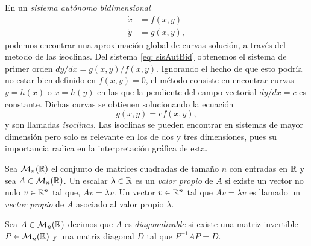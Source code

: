    En un \textit{sistema autónomo bidimensional}
   \begin{equation}
   	\begin{aligned}
   		\dot{x} &= f(x, y) \\
   		\dot{y} &= g(x, y),
   	\end{aligned}
   	\label{eq: sisAutBid}
   \end{equation}
   podemos encontrar una aproximación global de curvas solución, a través del metodo de las isoclinas. Del sistema \eqref{eq: sisAutBid} obtenemos el sistema de primer orden $dy/dx = g(x, y)/f(x, y)$. Ignorando el hecho de que esto podría no estar bien definido en $f(x, y) = 0$, el método consiste en encontrar curvas $y=h(x)$ o $x=h(y)$ en las que la pendiente del campo vectorial $dy/dx = c$ es constante. Dichas curvas se obtienen solucionando la ecuación
   \begin{equation}
    g(x, y) = cf(x, y),
    \label{eq: pendiente}
   \end{equation} 
   y son llamadas \textit{isoclinas}. Las isoclinas se pueden encontrar en sistemas de mayor dimensión pero solo es relevante en los de dos y tres dimensiones, pues su importancia radica en la interpretación gráfica de esta.
   
    Sea $\mathcal{M}_{n}({\mathbb{R}})$ el conjunto de matrices cuadradas de tamaño $n$ con entradas en ${\mathbb{R}}$ y sea $A \in \mathcal{M}_{n}({\mathbb{R}})$. Un escalar $\lambda \in {\mathbb{R}}$ es un \textit{valor propio} de $A$ si existe un vector no nulo $v \in {\mathbb{R}}^{n}$ tal que, $Av = \lambda v$. Un vector $v \in {\mathbb{R}}^{n}$ tal que $Av = \lambda v$ es llamado un \textit{vector propio} de $A$ asociado al valor propio $\lambda$.
   
    Sea $A \in \mathcal{M}_{n}({\mathbb{R}})$ decimos que $A$ es \textit{diagonalizable} si existe una matriz invertible $P \in \mathcal{M}_{n}({\mathbb{R}})$ y una matriz diagonal $D$ tal que $P^{-1}AP = D$.